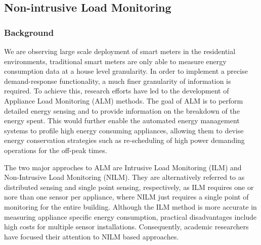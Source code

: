 \documentclass[12pt,twocolumn]{article}
\begin{document}
		\subsection{Non-intrusive Load Monitoring}

			\subsubsection*{Background}
			 \quad We are observing large scale deployment of smart meters in the residential environments, traditional smart meters are only able to measure energy consumption data at a house level granularity. In order to implement a precise demand-response functionality, a much finer granularity of information is required. To achieve this, research efforts have led to the development of Appliance Load Monitoring (ALM) methods. The goal of ALM is to perform detailed energy sensing and to provide information on the breakdown of the energy spent. This would further enable the automated energy management systems to profile high energy consuming appliances, allowing them to devise energy conservation strategies such as re-scheduling of high power demanding operations for the off-peak times.

			 The two major approches to ALM are Intrusive Load Monitoring (ILM) and Non-Intrusive Load Monitoring (NILM). They are alternatively referred to as distributed sensing and single point sensing, respectively, as ILM requires one or nore than one sensor per appliance, where NILM just requires a single point of monitoring for the entire building.  Although the ILM method is more accurate in measuring appliance specific energy consumption, practical disadvantages include high costs for multiple sensor installations. Consequently, academic researchers have focused their attention to NILM based approaches. 
\end{document}
